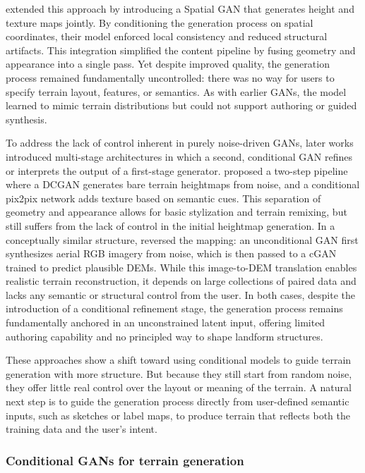\citep{Spick2019} extended this approach by introducing a Spatial GAN that generates height and texture maps jointly. By conditioning the generation process on spatial coordinates, their model enforced local consistency and reduced structural artifacts. This integration simplified the content pipeline by fusing geometry and appearance into a single pass. Yet despite improved quality, the generation process remained fundamentally uncontrolled: there was no way for users to specify terrain layout, features, or semantics. As with earlier GANs, the model learned to mimic terrain distributions but could not support authoring or guided synthesis.

To address the lack of control inherent in purely noise-driven GANs, later works introduced multi-stage architectures in which a second, conditional GAN refines or interprets the output of a first-stage generator. \citep{Beckham2017} proposed a two-step pipeline where a DCGAN generates bare terrain heightmaps from noise, and a conditional pix2pix network adds texture based on semantic cues. This separation of geometry and appearance allows for basic stylization and terrain remixing, but still suffers from the lack of control in the initial heightmap generation. In a conceptually similar structure, \citep{Panagiotou2020} reversed the mapping: an unconditional GAN first synthesizes aerial RGB imagery from noise, which is then passed to a cGAN trained to predict plausible DEMs. While this image-to-DEM translation enables realistic terrain reconstruction, it depends on large collections of paired data and lacks any semantic or structural control from the user. In both cases, despite the introduction of a conditional refinement stage, the generation process remains fundamentally anchored in an unconstrained latent input, offering limited authoring capability and no principled way to shape landform structures.

These approaches show a shift toward using conditional models to guide terrain generation with more structure. But because they still start from random noise, they offer little real control over the layout or meaning of the terrain. A natural next step is to guide the generation process directly from user-defined semantic inputs, such as sketches or label maps, to produce terrain that reflects both the training data and the user's intent.


\subsubsection{Conditional GANs for terrain generation}
\label{sec:coral-island-sota-cGAN}


